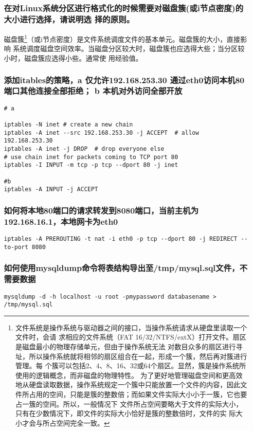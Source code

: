 \documentclass{article}
\begin{document}
\subsubsection{在对Linux系统分区进行格式化的时候需要对磁盘簇(或i节点密度)的大小进行选择，请说明选
择的原则。}
磁盘簇\footnote{ 文件系统是操作系统与驱动器之间的接口，当操作系统请求从硬盘里读取一个文件时，会请
求相应的文件系统（FAT 16/32/NTFS/extX）打开文件。扇区是磁盘最小的物理存储单元，但由于操作系统无法
对数目众多的扇区进行寻址，所以操作系统就将相邻的扇区组合在一起，形成一个簇，然后再对簇进行管理。每
个簇可以包括2、4、8、16、32或64个扇区。显然，簇是操作系统所使用的逻辑概念，而非磁盘的物理特性。
为了更好地管理磁盘空间和更高效地从硬盘读取数据，操作系统规定一个簇中只能放置一个文件的内容，因此文
件所占用的空间，只能是簇的整数倍；而如果文件实际大小小于一簇，它也要占一簇的空间。所以，一般情况下
文件所占空间要略大于文件的实际大小，只有在少数情况下，即文件的实际大小恰好是簇的整数倍时，文件的实
际大小才会与所占空间完全一致。}（或i节点密度）是文件系统调度文件的基本单元。磁盘簇的大小，直接影响
系统调度磁盘空间效率。当磁盘分区较大时，磁盘簇也应选得大些；当分区较小时，磁盘簇应选得小些。通常使
用经验值。

\subsubsection{添加itables的策略，a 仅允许192.168.253.30 通过eth0访问本机80端口其他连接全部拒绝；
b 本机对外访问全部开放}
\begin{verbatim}
# a

iptables -N inet # create a new chain
iptables -A inet --src 192.168.253.30 -j ACCEPT  # allow 192.168.253.30
iptables -A inet -j DROP  # drop everyone else
# use chain inet for packets coming to TCP port 80
iptables -I INPUT -m tcp -p tcp --dport 80 -j inet  

#b 
iptables -A INPUT -j ACCEPT

\end{verbatim}

\subsubsection{如何将本地80端口的请求转发到8080端口，当前主机为192.168.16.1，本地网卡为eth0}
\begin{verbatim}
iptables -A PREROUTING -t nat -i eth0 -p tcp --dport 80 -j REDIRECT --to-port 8080
\end{verbatim}

\subsubsection{如何使用mysqldump命令将表结构导出至/tmp/mysql.sql文件，不需要数据}
\begin{verbatim}
mysqldump -d -h localhost -u root -pmypassword databasename > /tmp/mysql.sql
\end{verbatim}
\end{document}
